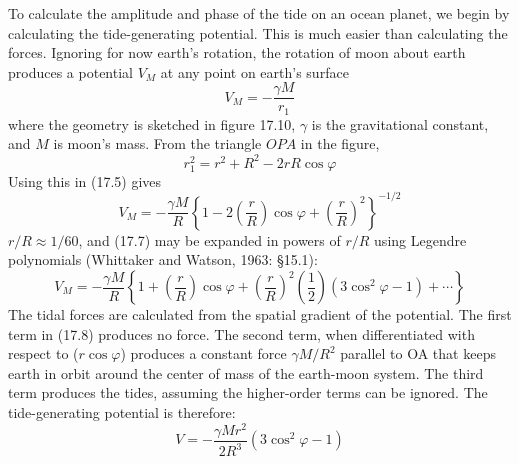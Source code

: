 To calculate the amplitude and phase of the tide on an ocean planet,
we begin by calculating the tide-generating
potential. This is much easier than calculating
the forces. Ignoring for now earth's rotation, the rotation of
moon about earth produces a potential $V_M$ at any point
on earth's surface
\begin{equation}
V_{M} = -\frac{\gamma M}{r_{1}}
\end{equation}
where the geometry is sketched in figure 17.10, $\gamma $ is the
gravitational constant, and $M$ is moon's mass. From the triangle
$OPA$ in the figure,
\begin{equation}
r_{1}^{2} = r^{2} + R^{2} - 2 r R \cos \varphi
\end{equation}
Using this in (17.5) gives
\begin{equation}
V_{M} = -\frac{\gamma M}{R} \left\{ 1 - 2 \left(\frac{r}{R}\right) \cos \varphi +
\left(\frac{r}{R}\right)^{2}\right\}^{-1/2}
\end{equation}
$r/R \approx 1/60$, and (17.7) may be expanded in powers of $r/R$
using Legendre polynomials (Whittaker and Watson, 1963: \S 15.1):
\begin{equation}
V_M = -\frac{\gamma M}{R} \left\{1+\left(\frac{r}{R}\right) \cos \varphi +
\left(\frac{r}{R}\right)^2 \left(\frac{1}{2}\right) (3\cos ^2 \varphi - 1) + \cdots
\right\}
\end{equation}
The tidal forces are calculated from the spatial gradient of the
potential. The first term in (17.8) produces no force. The second
term, when differentiated with respect to ($r \cos \varphi $) produces
a constant force $\gamma M/R^{2}$ parallel to OA that keeps earth in
orbit around the center of mass of the earth-moon system. The third
term produces the tides, assuming the higher-order terms can be
ignored. The tide-generating potential is therefore:
\begin{equation}
V= -\frac{\gamma M r^{2}}{2 R^{3}} (3 \cos ^2 \varphi - 1)
\end{equation}


